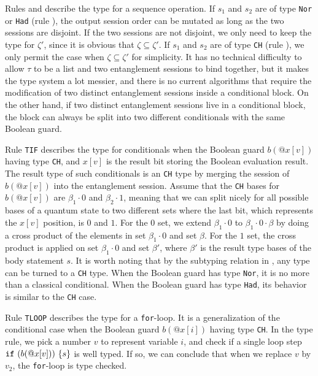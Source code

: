 Rules  and  describe the type for a sequence operation.
If $s_1$ and $s_2$ are of type \texttt{Nor} or \texttt{Had} (rule ),
the output session order can be mutated as long as the two sessions are disjoint.
If the two sessions are not disjoint, we only need to keep the type for $\zeta'$,
since it is obvious that $\zeta \subseteq \zeta'$. 
If $s_1$ and $s_2$ are of type \texttt{CH} (rule ),
we only permit the case when  $\zeta \subseteq \zeta'$ for simplicity.
It has no technical difficulty to allow $\tau$ to be a list
and two entanglement sessions to bind together,
but it makes the type system a lot messier,
and there is no current algorithms that require the modification of 
two distinct entanglement sessions inside a conditional block.
On the other hand, if two distinct entanglement sessions live in a conditional block,
the block can always be split into two different conditionals with the same Boolean guard.

Rule \texttt{TIF} describes the type for conditionals when the Boolean guard $b(@x[v])$ having type \texttt{CH},
and $x[v]$ is the result bit storing the Boolean evaluation result.
The result type of such conditionals is an \texttt{CH} type
by merging the session of $b(@x[v])$ into the entanglement session.
Assume that the \texttt{CH} bases for $b(@x[v])$ are $\beta_1\cdot 0$ and $\beta_2\cdot 1$, meaning
that we can split nicely for all possible bases of a quantum state to two different sets where the last bit, 
which represents the $x[v]$ position, is $0$ and $1$.
For the $0$ set, we extend $\beta_1\cdot 0$ to $\beta_1\cdot 0\cdot \beta$ 
by doing a cross product of the elements in set $\beta_1\cdot 0$ and set $\beta$.
For the $1$ set, the cross product is applied on set $\beta_1\cdot 0$ and set $\beta'$, 
where $\beta'$ is the result type bases of the body statement $s$.
It is worth noting that by the subtyping relation in , any type can be turned to a \texttt{CH} type.
When the Boolean guard has type \texttt{Nor}, it is no more than a classical conditional.
When the Boolean guard has type \texttt{Had}, its behavior is similar to the \texttt{CH} case.

Rule \texttt{TLOOP} describes the type for a \texttt{for}-loop.
It is a generalization of the conditional case when the Boolean guard $b(@x[i])$ having type \texttt{CH}.
In the type rule, we pick a number $v$ to represent variable $i$, 
and check if a single loop step $\texttt{if}~{(b(@x[v]))}~{\{s\}}$ is well typed.
If so, we can conclude that when we replace $v$ by $v_2$, the \texttt{for}-loop is type checked.

